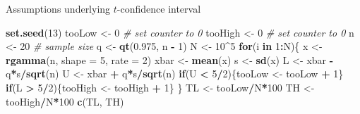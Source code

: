 \documentclass[
  ignorenonframetext,
]{beamer}
\newenvironment{Shaded}{\begin{snugshade}}{\end{snugshade}}
\newcommand{\AttributeTok}[1]{\textcolor[rgb]{0.13,0.29,0.53}{#1}}
\newcommand{\CommentTok}[1]{\textcolor[rgb]{0.56,0.35,0.01}{\textit{#1}}}
\newcommand{\ControlFlowTok}[1]{\textcolor[rgb]{0.13,0.29,0.53}{\textbf{#1}}}
\newcommand{\DecValTok}[1]{\textcolor[rgb]{0.00,0.00,0.81}{#1}}
\newcommand{\FloatTok}[1]{\textcolor[rgb]{0.00,0.00,0.81}{#1}}
\newcommand{\FunctionTok}[1]{\textcolor[rgb]{0.13,0.29,0.53}{\textbf{#1}}}
\newcommand{\NormalTok}[1]{#1}
\newcommand{\OtherTok}[1]{\textcolor[rgb]{0.56,0.35,0.01}{#1}}
\newcommand{\SpecialCharTok}[1]{\textcolor[rgb]{0.81,0.36,0.00}{\textbf{#1}}}
\begin{document}
\begin{frame}[fragile]{Assumptions underlying \(t\)-confidence interval}
\label{assumptions-underlying-t-confidence-interval-3}
\tiny

\begin{Shaded}
\begin{Highlighting}[]
\FunctionTok{set.seed}\NormalTok{(}\DecValTok{13}\NormalTok{)}
\NormalTok{tooLow }\OtherTok{\textless{}{-}} \DecValTok{0}       \CommentTok{\# set counter to 0}
\NormalTok{tooHigh }\OtherTok{\textless{}{-}} \DecValTok{0}      \CommentTok{\# set counter to 0}
\NormalTok{n }\OtherTok{\textless{}{-}} \DecValTok{20}           \CommentTok{\# sample size}
\NormalTok{q }\OtherTok{\textless{}{-}} \FunctionTok{qt}\NormalTok{(}\FloatTok{0.975}\NormalTok{, n }\SpecialCharTok{{-}} \DecValTok{1}\NormalTok{)}
\NormalTok{N }\OtherTok{\textless{}{-}} \DecValTok{10}\SpecialCharTok{\^{}}\DecValTok{5}
\ControlFlowTok{for}\NormalTok{(i }\ControlFlowTok{in} \DecValTok{1}\SpecialCharTok{:}\NormalTok{N)\{}
\NormalTok{  x }\OtherTok{\textless{}{-}} \FunctionTok{rgamma}\NormalTok{(n, }\AttributeTok{shape =} \DecValTok{5}\NormalTok{, }\AttributeTok{rate =} \DecValTok{2}\NormalTok{)}
\NormalTok{  xbar }\OtherTok{\textless{}{-}} \FunctionTok{mean}\NormalTok{(x)}
\NormalTok{  s }\OtherTok{\textless{}{-}} \FunctionTok{sd}\NormalTok{(x)}
\NormalTok{  L }\OtherTok{\textless{}{-}}\NormalTok{ xbar }\SpecialCharTok{{-}}\NormalTok{ q}\SpecialCharTok{*}\NormalTok{s}\SpecialCharTok{/}\FunctionTok{sqrt}\NormalTok{(n)}
\NormalTok{  U }\OtherTok{\textless{}{-}}\NormalTok{ xbar }\SpecialCharTok{+}\NormalTok{ q}\SpecialCharTok{*}\NormalTok{s}\SpecialCharTok{/}\FunctionTok{sqrt}\NormalTok{(n)}
  \ControlFlowTok{if}\NormalTok{(U }\SpecialCharTok{\textless{}} \DecValTok{5}\SpecialCharTok{/}\DecValTok{2}\NormalTok{)\{tooLow }\OtherTok{\textless{}{-}}\NormalTok{ tooLow }\SpecialCharTok{+} \DecValTok{1}\NormalTok{\}}
  \ControlFlowTok{if}\NormalTok{(L }\SpecialCharTok{\textgreater{}} \DecValTok{5}\SpecialCharTok{/}\DecValTok{2}\NormalTok{)\{tooHigh }\OtherTok{\textless{}{-}}\NormalTok{ tooHigh }\SpecialCharTok{+} \DecValTok{1}\NormalTok{\}}
\NormalTok{\}}
\NormalTok{TL }\OtherTok{\textless{}{-}}\NormalTok{ tooLow}\SpecialCharTok{/}\NormalTok{N}\SpecialCharTok{*}\DecValTok{100}
\NormalTok{TH }\OtherTok{\textless{}{-}}\NormalTok{ tooHigh}\SpecialCharTok{/}\NormalTok{N}\SpecialCharTok{*}\DecValTok{100}
\FunctionTok{c}\NormalTok{(TL, TH)}
\end{Highlighting}
\end{Shaded}


\end{frame}
\end{document}
